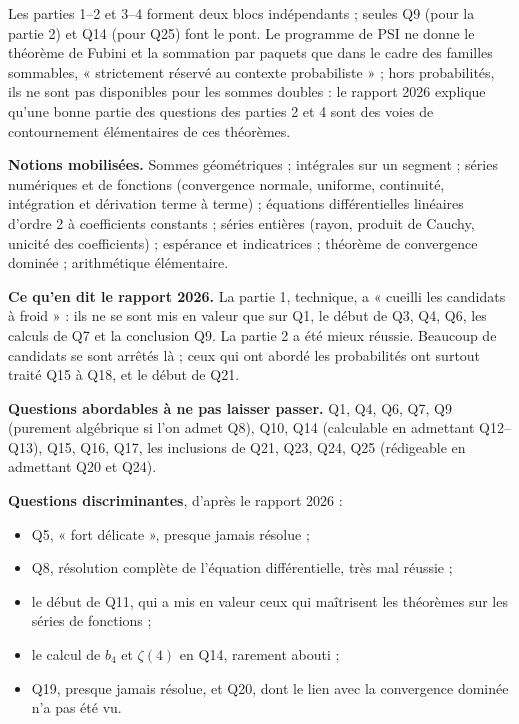 \documentclass[11pt,a4paper]{article}
\providecommand{\tightlist}{\setlength{\itemsep}{0pt}\setlength{\parskip}{0pt}}
\begin{document}
Les parties 1--2 et 3--4 forment deux blocs indépendants ; seules Q9 (pour la partie 2) et Q14 (pour Q25) font le pont. Le programme de PSI ne donne le théorème de Fubini et la sommation par paquets que dans le cadre des familles sommables, « strictement réservé au contexte probabiliste » ; hors probabilités, ils ne sont pas disponibles pour les sommes doubles : le rapport 2026 explique qu'une bonne partie des questions des parties 2 et 4 sont des voies de contournement élémentaires de ces théorèmes.

\textbf{Notions mobilisées.} Sommes géométriques ; intégrales sur un segment ; séries numériques et de fonctions (convergence normale, uniforme, continuité, intégration et dérivation terme à terme) ; équations différentielles linéaires d'ordre 2 à coefficients constants ; séries entières (rayon, produit de Cauchy, unicité des coefficients) ; espérance et indicatrices ; théorème de convergence dominée ; arithmétique élémentaire.

\textbf{Ce qu'en dit le rapport 2026.} La partie 1, technique, a « cueilli les candidats à froid » : ils ne se sont mis en valeur que sur Q1, le début de Q3, Q4, Q6, les calculs de Q7 et la conclusion Q9. La partie 2 a été mieux réussie. Beaucoup de candidats se sont arrêtés là ; ceux qui ont abordé les probabilités ont surtout traité Q15 à Q18, et le début de Q21.

\textbf{Questions abordables à ne pas laisser passer.} Q1, Q4, Q6, Q7, Q9 (purement algébrique si l'on admet Q8), Q10, Q14 (calculable en admettant Q12--Q13), Q15, Q16, Q17, les inclusions de Q21, Q23, Q24, Q25 (rédigeable en admettant Q20 et Q24).

\textbf{Questions discriminantes}, d'après le rapport 2026 :

\begin{itemize}
\tightlist
\item
  Q5, « fort délicate », presque jamais résolue ;
\item
  Q8, résolution complète de l'équation différentielle, très mal réussie ;
\item
  le début de Q11, qui a mis en valeur ceux qui maîtrisent les théorèmes sur les séries de fonctions ;
\item
  le calcul de \(b_4\) et \(\zeta(4)\) en Q14, rarement abouti ;
\item
  Q19, presque jamais résolue, et Q20, dont le lien avec la convergence dominée n'a pas été vu.
\end{itemize}
\end{document}
